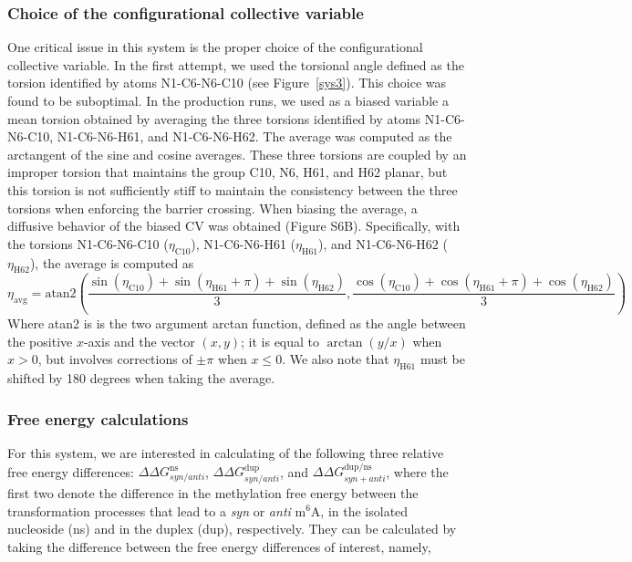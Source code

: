 \documentclass[journal=jacsat,manuscript=article]{achemso}
\begin{document}
\subsubsection{Choice of the configurational collective variable}
One critical issue in this system is the proper choice of the configurational collective variable. In the first attempt, we used the torsional angle defined as the torsion identified by atoms N1-C6-N6-C10 (see Figure~\ref{sys3}). This choice was found to be suboptimal. In the production runs, we used as a biased variable a mean torsion obtained by averaging the three torsions identified by atoms N1-C6-N6-C10,  N1-C6-N6-H61, and N1-C6-N6-H62. The average was computed as the arctangent of the sine and cosine averages. These three torsions are coupled by an improper torsion that maintains the group C10, N6, H61, and H62 planar, but this torsion is not sufficiently stiff to maintain the consistency between the three torsions when enforcing the barrier crossing. When biasing the average, a diffusive behavior of the biased CV was obtained (Figure S6B).
Specifically, with the torsions N1-C6-N6-C10 ($\eta_{\text{C10}}$), N1-C6-N6-H61 ($\eta_{\text{H61}}$), and N1-C6-N6-H62 ($\eta_{\text{H62}}$), the average is computed as 
\begin{equation}
    \eta _{\text{avg}}=\textrm{atan2}\left(\frac{\sin(\eta_{\text{C10}})+\sin(\eta_{\text{H61}}+\pi)+\sin(\eta_{\text{H62}})}{3},\frac{\cos(\eta_{\text{C10}})+\cos(\eta_{\text{H61}}+\pi)+\cos(\eta_{\text{H62}})}{3}\right)
\end{equation}
Where atan2 is is the two argument arctan function, defined as the angle between the positive $x$-axis and the vector $(x,y)$; it is equal to $\arctan(y/x)$ when $x> 0$, but involves corrections of $\pm\pi$ when $x \le 0$.  We also note that $\eta_{\text{H61}}$ must be shifted by 180 degrees when taking the average.

\subsubsection{Free energy calculations}
For this system, we are interested in calculating of the following three relative free energy differences: $\Delta \Delta G^{\text{ns}}_{syn/anti}$, $\Delta \Delta G^{\text{dup}}_{syn/anti}$, and $\Delta \Delta G^\text{dup/ns}_{syn+anti}$, where the first two denote the difference in the methylation free energy between the transformation processes that lead to a \emph{syn} or \emph{anti} m$^6$A, in the isolated nucleoside (ns) and in the duplex (dup), respectively. They can be calculated by taking the difference between the free energy differences of interest, namely, 
\end{document}
